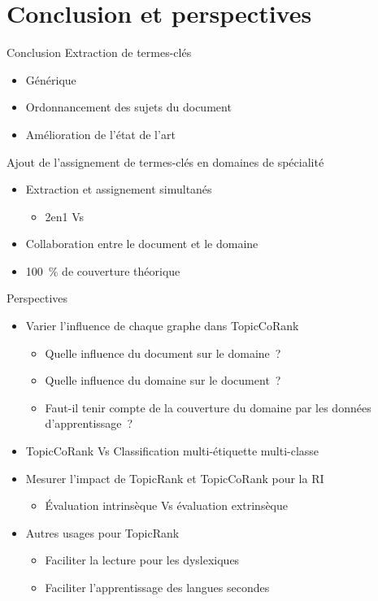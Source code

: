\section{Conclusion et perspectives}
  \begin{frame}{Conclusion}
    Extraction de termes-clés
    \begin{itemize}
      \item{Générique}
      \item{Ordonnancement des sujets du document}
      \item{Amélioration de l'état de l'art}
    \end{itemize}

    \vspace{1em}

    Ajout de l'assignement de termes-clés en domaines de spécialité
    \begin{itemize}
      \item{Extraction et assignement simultanés}
      \begin{itemize}
        \item{2en1 Vs \cite{jacquemin1997fastr}}
      \end{itemize}
      \item{Collaboration entre le document et le domaine}
      \item{100~\% de couverture théorique}
    \end{itemize}
  \end{frame}

  \begin{frame}{Perspectives}
    \begin{itemize}
      \item{Varier l'influence de chaque graphe dans TopicCoRank}
      \begin{itemize}
        \item{Quelle influence du document sur le domaine~?}
        \item{Quelle influence du domaine sur le document~?}
        \item{Faut-il tenir compte de la couverture du domaine par les données
              d'apprentissage~?}
      \end{itemize}
      \item{TopicCoRank Vs Classification multi-étiquette multi-classe}
      \item{Mesurer l'impact de TopicRank et TopicCoRank pour la RI}
      \begin{itemize}
        \item{Évaluation intrinsèque Vs évaluation extrinsèque}
      \end{itemize}
      \item{Autres usages pour TopicRank}
      \begin{itemize}
        \item{Faciliter la lecture pour les
              dyslexiques~\cite{rello2014dislexia}}
        \item{Faciliter l'apprentissage des langues
              secondes~\cite{pressley1982mnemonickeywordmethod}}
      \end{itemize}
    \end{itemize}
  \end{frame}

